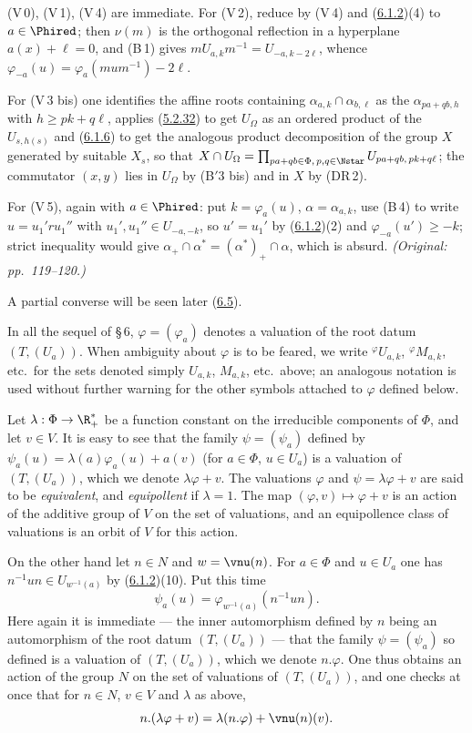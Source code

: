 \documentclass[12pt,a4paper,oneside,english]{smfart}
\makeatletter
\newcommand{\btanchor}[1]{\leavevmode\Hy@raisedlink{\hypertarget{bt:#1}{}}}
\newcommand{\btref}[1]{\hyperlink{bt:#1}{#1}}
\theoremstyle{definition}
\theoremstyle{bt}
\makeatother
\begin{document}
\begin{sketch}
(V\,0), (V\,1), (V\,4) are immediate. For (V\,2), reduce by (V\,4) and
(\btref{6.1.2})(4) to $a\in\Phired$; then $\nu(m)$ is the orthogonal reflection in a
hyperplane $a(x)+\ell=0$, and (B\,1) gives $mU_{a,k}m^{-1}=U_{-a,k-2\ell}$,
whence $\varphi_{-a}(u)=\varphi_a(mum^{-1})-2\ell$.

For (V\,3 bis) one identifies the affine roots containing
$\alpha_{a,k}\cap\alpha_{b,\ell}$ as the $\alpha_{pa+qb,h}$ with
$h\ge pk+q\ell$, applies (\btref{5.2.32}) to get $U_\Omega$ as an ordered product of the
$U_{s,h(s)}$ and (\btref{6.1.6}) to get the analogous product decomposition of the group
$X$ generated by suitable $X_s$, so that
$X\cap U_\Omega=\prod_{pa+qb\in\Phi,\,p,q\in\Nstar}U_{pa+qb,\,pk+q\ell}$;
the commutator $(x,y)$ lies in $U_\Omega$ by (B$'$3 bis) and in $X$ by (DR\,2).

For (V\,5), again with $a\in\Phired$: put $k=\varphi_a(u)$,
$\alpha=\alpha_{a,k}$, use (B\,4) to write $u=u_1'ru_1''$ with
$u_1',u_1''\in U_{-a,-k}$, so $u'=u_1'$ by (\btref{6.1.2})(2) and
$\varphi_{-a}(u')\ge-k$; strict inequality would give
$\alpha_{+}\cap\alpha^{*}=(\alpha^{*})_{+}\cap\alpha$, which is absurd.
\emph{(Original: pp.~119--120.)}
\end{sketch}
\noindent A partial converse will be seen later (\btref{6.5}).

\btanchor{6.2.4} In all the sequel of \S\,6, $\varphi=(\varphi_a)$ denotes a valuation
of the root datum $(T,(U_a))$. When ambiguity about $\varphi$ is to be feared, we
write ${}^{\varphi}U_{a,k}$, ${}^{\varphi}M_{a,k}$, etc.\ for the sets denoted
simply $U_{a,k}$, $M_{a,k}$, etc.\ above; an analogous notation is used without
further warning for the other symbols attached to $\varphi$ defined below.

\btanchor{6.2.5} Let $\lambda:\Phi\to\R^{*}_{+}$ be a function constant on the
irreducible components of $\Phi$, and let $v\in V$. It is easy to see that the
family $\psi=(\psi_a)$ defined by $\psi_a(u)=\lambda(a)\varphi_a(u)+a(v)$ (for
$a\in\Phi$, $u\in U_a$) is a valuation of $(T,(U_a))$, which we denote
$\lambda\varphi+v$. The valuations $\varphi$ and $\psi=\lambda\varphi+v$ are said
to be \emph{equivalent}, and \emph{equipollent} if $\lambda=1$. The map
$(\varphi,v)\mapsto\varphi+v$ is an action of the additive group of $V$ on the set
of valuations, and an equipollence class of valuations is an orbit of $V$ for this
action.

On the other hand let $n\in N$ and $w=\vnu(n)$. For $a\in\Phi$ and $u\in U_a$ one
has $n^{-1}un\in U_{w^{-1}(a)}$ by (\btref{6.1.2})(10). Put this time
\[ \psi_a(u)=\varphi_{w^{-1}(a)}(n^{-1}un). \]
Here again it is immediate --- the inner automorphism defined by $n$ being an
automorphism of the root datum $(T,(U_a))$ --- that the family $\psi=(\psi_a)$ so
defined is a valuation of $(T,(U_a))$, which we denote $n.\varphi$. One thus
obtains an action of the group $N$ on the set of valuations of $(T,(U_a))$, and
one checks at once that for $n\in N$, $v\in V$ and $\lambda$ as above,
\begin{equation}
n.(\lambda\varphi+v)=\lambda(n.\varphi)+\vnu(n)(v).
\end{equation}
\end{document}

